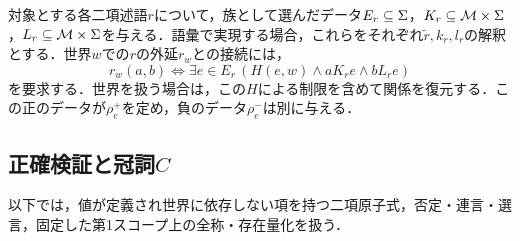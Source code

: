 \documentclass[../../main-detail.tex]{subfiles}
\begin{document}
\begin{definition}[原子検証のデータ]
    対象とする各二項述語$r$について，族として選んだデータ$E_r\subseteq\Sigma$，$K_r\subseteq\mathcal M\times\Sigma$，$L_r\subseteq\mathcal M\times\Sigma$を与える．語彙で実現する場合，これらをそれぞれ$\tilde r,k_r,l_r$の解釈とする．世界$w$での$r$の外延$r_w$との接続には，
    \[
        r_w(a,b)\iff\exists e\in E_r\,
        (H(e,w)\land aK_re\land bL_re)
    \]
    を要求する．世界を扱う場合は，この$H$による制限を含めて関係を復元する．この正のデータが$\rho_e^+$を定め，負のデータ$\rho_e^-$は別に与える．
\end{definition}

\subsection{正確検証と冠詞$C$}
以下では，値が定義され世界に依存しない項を持つ二項原子式，否定・連言・選言，固定した第1スコープ上の全称・存在量化を扱う．
\end{document}
